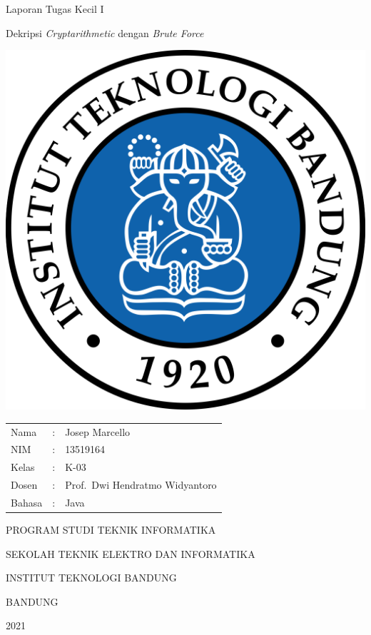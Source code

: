 \documentclass{article}
\begin{document}
\begin{titlepage}
  \centering
  \Large Laporan Tugas Kecil I

  \large Dekripsi \textit{Cryptarithmetic} dengan \textit{Brute Force}

  \normalsize


  \includegraphics[scale=0.2]{logo-itb.png}

  \begin{tabular}{lll}
    Nama  &: & Josep Marcello \\
    NIM &: & 13519164 \\
    Kelas &: & K-03 \\
    Dosen &: & Prof.\ Dwi Hendratmo Widyantoro \\
    Bahasa &: & Java \\
  \end{tabular}

  \large
  PROGRAM STUDI TEKNIK INFORMATIKA

  SEKOLAH TEKNIK ELEKTRO DAN INFORMATIKA

  INSTITUT TEKNOLOGI BANDUNG

  BANDUNG

  2021

\end{titlepage}
\end{document}
